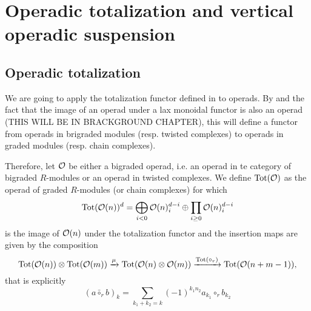 \documentclass[twoside]{article}
\begin{document}



\section{Operadic totalization and vertical operadic suspension}\label{operadic}
\subsection{Operadic totalization}


We are going to apply the totalization  functor defined in  to operads. By  and the fact that the image of an operad under a lax monoidal functor is also an operad (THIS WILL BE IN BRACKGROUND CHAPTER), this will define a functor from operads in brigraded modules (resp. twisted complexes) to operads in graded modules (resp. chain complexes). %

Therefore, let ${\mathcal O}$ be either a bigraded operad, i.e. an operad in te category of bigraded $R$-modules or an operad in twisted complexes. We define $\mathrm{Tot}({\mathcal O})$ as the operad of graded $R$-modules (or chain complexes) for which \[\mathrm{Tot}({\mathcal O}(n))^d=\bigoplus_{i<0}{\mathcal O}(n)^{d-i}_i\oplus\prod_{i\geq 0} {\mathcal O}(n)^{d-i}_i\] is the image of ${\mathcal O}(n)$ under the totalization functor and the insertion maps are given by the composition  %
\begin{equation}\label{insertion}
\mathrm{Tot}({\mathcal O}(n))\otimes \mathrm{Tot}({\mathcal O}(m))\xrightarrow{\mu} \mathrm{Tot}({\mathcal O}(n)\otimes {\mathcal O}(m)) \xrightarrow{\mathrm{Tot}(\circ_r)} \mathrm{Tot}({\mathcal O}(n+m-1)),
\end{equation}
that is explicitly 
\[(a\bar{\circ}_rb)_k=\sum_{k_1+k_2=k} (-1)^{k_1n_2} a_{k_1}\circ_r b_{k_2}\]
\end{document}
